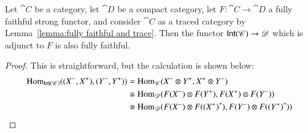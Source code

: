 \documentclass[12pt,oneside,article,draft]{memoir}
\begin{document}
\begin{lemma}\label{lemma:more fully faithfulness}
	Let $\cat{C}$ be a category, let $\cat{D}$ be a compact category, let $F\colon\cat{C}\to\cat{D}$ a fully faithful strong functor, and consider $\cat{C}$ as a traced category by Lemma~\ref{lemma:fully faithful and trace}. Then the functor $\mathsf{Int}(\mathscr{C})\to\mathscr{D}$ which is adjunct to $F$ is also fully faithful.
\end{lemma}
\begin{proof}
	This is straightforward, but the calculation is shown below:
	\begin{align*}
		\operatorname{Hom}_{\mathsf{Int}(\mathscr{C})}((X^-,X^+),(Y^-,Y^+))&=\operatorname{Hom}_{\mathscr{C}}(X^-\otimes Y^+,X^+\otimes Y^-) \\
		&\cong\operatorname{Hom}_{\mathscr{D}}(F(X^-)\otimes F(Y^+),F(X^+)\otimes F(Y^-)) \\
		&\cong\operatorname{Hom}_{\mathscr{D}}(F(X^-)\otimes F({(X^+)}^*),F(Y^-)\otimes F({(Y^+)}^*))
	\end{align*}
\end{proof}
\end{document}
